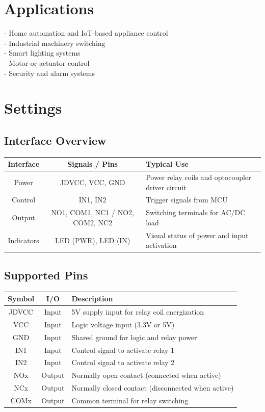 \documentclass[10pt]{article}
\begin{document}
\section*{Applications}
- Home automation and IoT-based appliance control\\ 
- Industrial machinery switching\\ 
- Smart lighting systems\\ 
- Motor or actuator control\\ 
- Security and alarm systems\\ 

\vspace{1em}



\section*{Settings}

\subsection*{Interface Overview}
\begin{tabularx}{\textwidth}{|c|c|>{\RaggedRight\arraybackslash}X|}
\hline
\rowcolor{headergray}
Interface & Signals / Pins & Typical Use \\
\hline
Power & JDVCC, VCC, GND & Power relay coils and optocoupler driver circuit \\
Control & IN1, IN2 & Trigger signals from MCU \\
Output & NO1, COM1, NC1 / NO2, COM2, NC2 & Switching terminals for AC/DC load \\
Indicators & LED (PWR), LED (IN) & Visual status of power and input activation \\
\hline
\end{tabularx}


\subsection*{Supported Pins}
\begin{tabularx}{\textwidth}{|c|c|>{\RaggedRight\arraybackslash}X|}
\hline
\rowcolor{headergray}
Symbol & I/O & Description \\
\hline
JDVCC & Input & 5V supply input for relay coil energization \\
VCC & Input & Logic voltage input (3.3V or 5V) \\
GND & Input & Shared ground for logic and relay power \\
IN1 & Input & Control signal to activate relay 1 \\
IN2 & Input & Control signal to activate relay 2 \\
NOx & Output & Normally open contact (connected when active) \\
NCx & Output & Normally closed contact (disconnected when active) \\
COMx & Output & Common terminal for relay switching \\
\hline
\end{tabularx}
\end{document}
